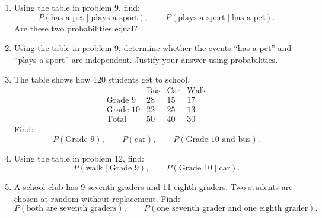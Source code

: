 \documentclass[12pt]{article}
\begin{document}
\begin{enumerate}[leftmargin=*, itemsep=1em, topsep=0.8em]
  \item Using the table in problem 9, find:
  \[
  P(\text{has a pet}\mid \text{plays a sport}),\qquad
  P(\text{plays a sport}\mid \text{has a pet}).
  \]
  Are these two probabilities equal?

  \item Using the table in problem 9, determine whether the events ``has a pet'' and ``plays a sport'' are independent. Justify your answer using probabilities.

  \item The table shows how 120 students get to school.
  \[
  \begin{array}{c|ccc}
   & \text{Bus} & \text{Car} & \text{Walk} \\ \hline
  \text{Grade 9} & 28 & 15 & 17 \\
  \text{Grade 10} & 22 & 25 & 13 \\ \hline
  \text{Total} & 50 & 40 & 30
  \end{array}
  \]
  Find:
  \[
  P(\text{Grade 9}),\qquad
  P(\text{car}),\qquad
  P(\text{Grade 10 and bus}).
  \]

  \item Using the table in problem 12, find:
  \[
  P(\text{walk}\mid \text{Grade 9}),\qquad
  P(\text{Grade 10}\mid \text{car}).
  \]

  \item A school club has 9 seventh graders and 11 eighth graders. Two students are chosen at random without replacement. Find:
  \[
  P(\text{both are seventh graders}),\qquad
  P(\text{one seventh grader and one eighth grader}).
  \]
\end{enumerate}
\end{document}
